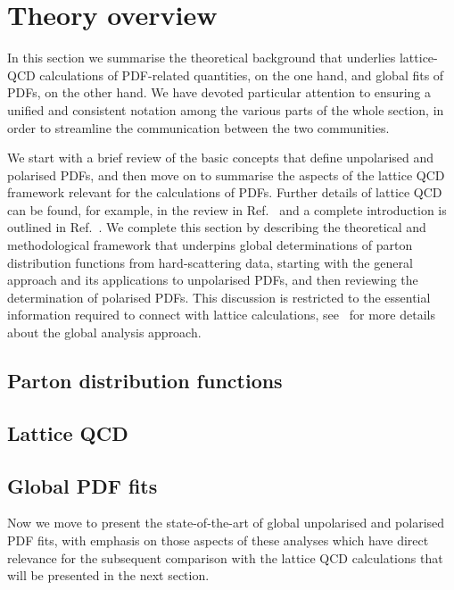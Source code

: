 
\section{Theory overview}
\label{sec:theoryoverview}

In this section we summarise the theoretical background that underlies
lattice-QCD calculations of PDF-related quantities, on the one hand, and 
global fits of PDFs, on the other hand.
%
We have devoted particular attention to ensuring a unified and
consistent notation among the various parts of the whole section,
in order to streamline the communication between the two communities.

We start with a brief review
of the basic concepts that define
unpolarised and polarised PDFs, and then
move on to
summarise the aspects of the lattice QCD framework
relevant for the calculations of PDFs. 
%
Further details of lattice QCD can be found, for example, in the
review in Ref.~\cite{Olive:2016xmw} and a complete
introduction is outlined in Ref.~\cite{Gupta:1997nd}. 
%
We complete this section by describing the theoretical and methodological 
framework that 
underpins global determinations of parton distribution functions from 
hard-scattering data, starting with the general approach and its applications 
to unpolarised PDFs, and then reviewing the determination of 
polarised PDFs.
%
This discussion is restricted to the
essential information required to connect
with lattice calculations,
see~\cite{Perez:2012um,DeRoeck:2011na,Alekhin:2011sk,Ball:2012wy,
Forte:2013wc,Jimenez-Delgado:2013sma,Rojo:2015acz,Butterworth:2015oua,
Accardi:2016ndt,Gao:2017yyd} for
more details about the global analysis approach.

\subsection{Parton distribution functions}
\label{Sec:IntroPDFs}



\subsection{Lattice QCD}
\label{Sec:IntroLQCD}



\subsection{Global PDF fits}
\label{Sec:IntroGlobalFits}

Now we move to present the state-of-the-art of global
unpolarised and polarised PDF fits, with emphasis on those
aspects of these analyses which have direct relevance for
the subsequent comparison with the lattice QCD calculations
that will be presented in the next section.




